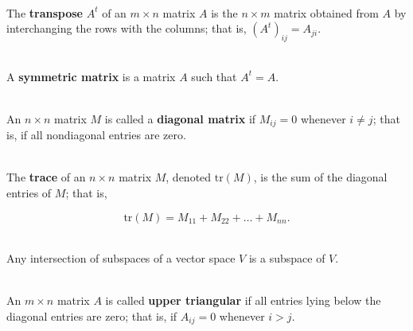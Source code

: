 \begin{definition}
	\hfill\\
	The \textbf{transpose} $A^t$ of an $m \times n$ matrix $A$ is the $n \times m$ matrix obtained from $A$ by interchanging the rows with the columns; that is, $(A^t)_{ij} = A_{ji}$.
\end{definition}

\begin{definition}
	\hfill\\
	A \textbf{symmetric matrix} is a matrix $A$ such that $A^t = A$.
\end{definition}

\begin{definition}
	\hfill\\
	An $n \times n$ matrix $M$ is called a \textbf{diagonal matrix} if $M_{ij} = 0$ whenever $i \neq j$; that is, if all nondiagonal entries are zero.
\end{definition}

\begin{definition}
	\hfill\\
	The \textbf{trace} of an $n \times n$ matrix $M$, denoted $\text{tr}(M)$, is the sum of the diagonal entries of $M$; that is,
	
	\[\text{tr}(M) = M_{11} + M_{22} + \dots + M_{nn}.\]
\end{definition}

\begin{theorem}
	\hfill\\
	Any intersection of subspaces of a vector space $V$ is a subspace of $V$.
\end{theorem}

\begin{definition}
	\hfill\\
	An $m \times n$ matrix $A$ is called \textbf{upper triangular} if all entries lying below the diagonal entries are zero; that is, if $A_{ij} = 0$ whenever $i > j$.
\end{definition}